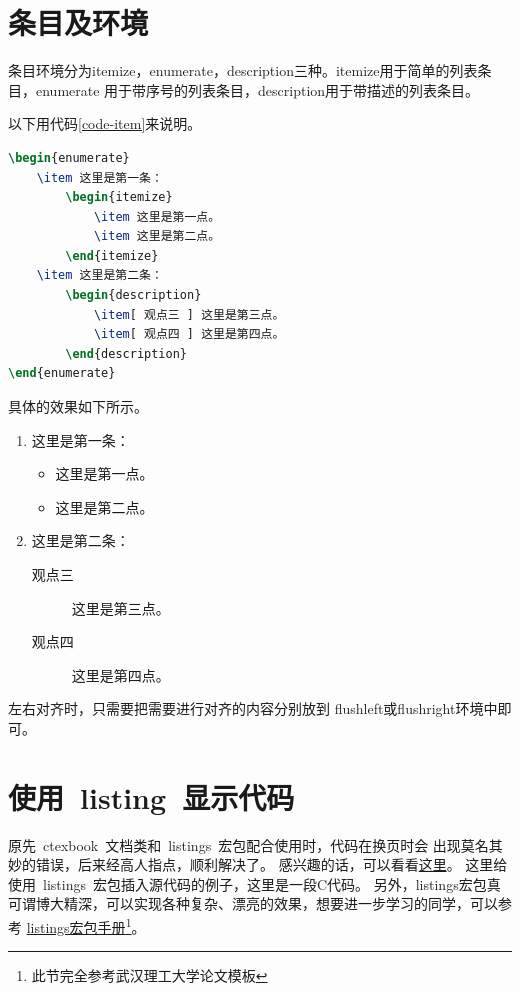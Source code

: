 \section{条目及环境}
\label{sec-item}
条目环境分为itemize，enumerate，description三种。itemize用于简单的列表条目，enumerate
用于带序号的列表条目，description用于带描述的列表条目。

以下用代码\ref{code-item}来说明。
\begin{lstlisting}[label={code-item},caption={条目环境},language={LaTeX}]
\begin{enumerate}
    \item 这里是第一条：
        \begin{itemize}
            \item 这里是第一点。
            \item 这里是第二点。
        \end{itemize}
    \item 这里是第二条：
        \begin{description}
            \item[ 观点三 ] 这里是第三点。
            \item[ 观点四 ] 这里是第四点。
        \end{description}
\end{enumerate}
\end{lstlisting}

具体的效果如下所示。
\begin{enumerate}
    \item 这里是第一条：
        \begin{itemize}
            \item 这里是第一点。
            \item 这里是第二点。
        \end{itemize}
    \item 这里是第二条：
        \begin{description}
            \item[观点三] 这里是第三点。
            \item[观点四] 这里是第四点。
        \end{description}
\end{enumerate}

左右对齐时，只需要把需要进行对齐的内容分别放到 flushleft或flushright环境中即可。

\section{使用~listing~显示代码}
\label{sec-listing}
原先~ctexbook~文档类和~listings~宏包配合使用时，代码在换页时会
出现莫名其妙的错误，后来经高人指点，顺利解决了。
感兴趣的话，可以看看\href{http://bbs.ctex.org/viewthread.php?tid=53451}{这里}。
这里给使用~listings~宏包插入源代码的例子，这里是一段C代码。
另外，listings宏包真可谓博大精深，可以实现各种复杂、漂亮的效果，想要进一步学习的同学，可以参考
\href{http://mirror.ctan.org/macros/latex/contrib/listings/listings.pdf}
{listings宏包手册\footnote{此节完全参考武汉理工大学论文模板}}。

